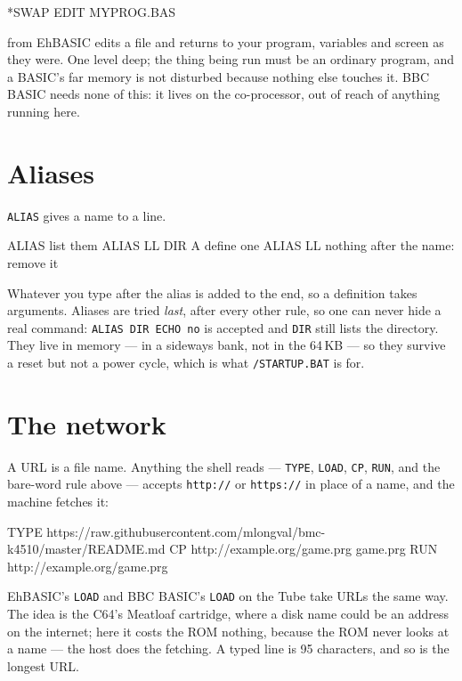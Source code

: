 \begin{type}
*SWAP EDIT MYPROG.BAS
\end{type}

from EhBASIC edits a file and returns to your program, variables and screen
as they were. One level deep; the thing being run must be an ordinary
program, and a BASIC's far memory is not disturbed because nothing else
touches it. BBC BASIC needs none of this: it lives on the co-processor,
out of reach of anything running here.

\section{Aliases}
\verb|ALIAS| gives a name to a line.

\begin{type}
ALIAS                    list them
ALIAS LL DIR A           define one
ALIAS LL                 nothing after the name: remove it
\end{type}

Whatever you type after the alias is added to the end, so a definition
takes arguments. Aliases are tried \emph{last}, after every other rule, so
one can never hide a real command: \verb|ALIAS DIR ECHO no| is accepted
and \verb|DIR| still lists the directory. They live in memory --- in a
sideways bank, not in the 64\,KB --- so they survive a reset but not a
power cycle, which is what \verb|/STARTUP.BAT| is for.

\section{The network}
A URL is a file name. Anything the shell reads --- \verb|TYPE|, \verb|LOAD|,
\verb|CP|, \verb|RUN|, and the bare-word rule above --- accepts
\texttt{http://} or \texttt{https://} in place of a name, and the machine
fetches it:

\begin{type}
TYPE https://raw.githubusercontent.com/mlongval/bmc-k4510/master/README.md
CP http://example.org/game.prg game.prg
RUN http://example.org/game.prg
\end{type}

EhBASIC's \verb|LOAD| and BBC BASIC's \verb|LOAD| on the Tube take URLs the
same way. The idea is the C64's Meatloaf cartridge, where a disk name could
be an address on the internet; here it costs the ROM nothing, because the
ROM never looks at a name --- the host does the fetching. A typed line is 95
characters, and so is the longest URL.

